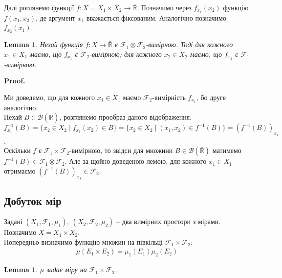 \documentclass[a4paper, 10pt]{article}
\makeatletter
\theoremstyle{theoremdd}
\newtheorem{lemma}[theorem]{Lemma}
\renewenvironment{proof}[1][Proof.\\]{\par
\pushQED{\hfill \qed}%
\normalfont \topsep6\p@\@plus6\p@\relax
\trivlist
\item\relax
{\bfseries
#1\@addpunct{.}}\hspace\labelsep\ignorespaces
}{%
\popQED\endtrivlist\@endpefalse
}
\makeatother
\begin{document}
Далі роглянемо функції $f \colon X = X_1 \times X_2 \to \bar{\mathbb{R}}$. Позначимо через $f_{x_1}(x_2)$ функцію $f(x_1,x_2)$, де аргумент $x_1$ вважається фіксованим. Аналогічно позначимо $f_{x_2}(x_1)$.

\begin{lemma}
Нехай функція $f \colon X \to \bar{\mathbb{R}}$ є $\mathcal{F}_1 \otimes \mathcal{F}_2$-вимірною. Тоді для кожного $x_1 \in X_1$ маємо, що $f_{x_1}$ є $\mathcal{F}_2$-вимірною; для кожного $x_2 \in X_2$ маємо, що $f_{x_2}$ є $\mathcal{F}_1$-вимірною.
\end{lemma}

\begin{proof}
Ми доведемо, що для кожного $x_1 \in X_1$ маємо $\mathcal{F}_2$-вимірність $f_{x_1}$, бо друге аналогічно.\\
Нехай $B \in \mathcal{B}(\bar{\mathbb{R}})$, розглянемо прообраз даного відображення:\\
$f_{x_1}^{-1}(B) = \{ x_2 \in X_2 \mid f_{x_1}(x_2) \in B \} = \{x_2 \in X_2 \mid (x_1,x_2) \in f^{-1}(B)\} = (f^{-1}(B))_{x_1}$.\\
Оскільки $f$ є $\mathcal{F}_1 \times \mathcal{F}_2$-вимірною, то звідси для множини $B \in \mathcal{B}(\bar{\mathbb{R}})$ матимемо $f^{-1}(B) \in \mathcal{F}_1 \otimes \mathcal{F}_2$. Але за щойно доведеною лемою, для кожного $x_1 \in X_1$ отримаємо $(f^{-1}(B))_{x_1} \in \mathcal{F}_2$.
\end{proof}

\subsection{Добуток мір}
Задані $(X_1,\mathcal{F}_1, \mu_1),\ (X_2,\mathcal{F}_2,\mu_2)$ -- два вимірних простори з мірами. Позначимо $X = X_1 \times X_2$.\\
Попередньо визначимо функцію множин на півкільці $\mathcal{F}_1 \times \mathcal{F}_2$:
\begin{align*}
\mu(E_1 \times E_2) = \mu_1(E_1) \mu_2(E_2)
\end{align*}

\begin{lemma}
$\mu$ задає міру на $\mathcal{F}_1 \times \mathcal{F}_2$.
\end{lemma}
\end{document}
